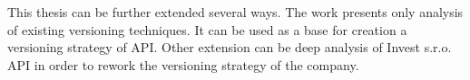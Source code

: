This thesis can be further extended several ways. The work presents only analysis of existing versioning techniques. It can be used as a base for creation a versioning strategy of API. Other extension can be deep analysis of Invest s.r.o. API in order to rework the versioning strategy of the company.  




